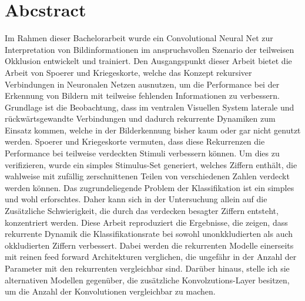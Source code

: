 \section*{Abcstract}
Im Rahmen dieser Bachelorarbeit wurde ein Convolutional Neural Net zur Interpretation von Bildinformationen im anspruchsvollen Szenario der teilweisen Okklusion entwickelt und trainiert. Den Ausgangspunkt dieser Arbeit bietet die Arbeit von Spoerer und Kriegeskorte, welche das Konzept rekursiver Verbindungen in Neuronalen Netzen ausnutzen, um die Performance bei der Erkennung von Bildern mit teilweise fehlenden Informationen zu verbessern. Grundlage ist die Beobachtung, dass im ventralen Visuellen System laterale und rückwärtsgewandte Verbindungen und dadurch rekurrente Dynamiken zum Einsatz kommen, welche in der Bilderkennung bisher kaum oder gar nicht genutzt werden. Spoerer und Kriegeskorte vermuten, dass diese Rekurrenzen die Performance bei teilweise verdeckten Stimuli verbessern können. Um dies zu verifizieren, wurde ein simples Stimulus-Set generiert, welches Ziffern enthält, die wahlweise mit zufällig zerschnittenen Teilen von verschiedenen Zahlen verdeckt werden können. Das zugrundeliegende Problem der Klassifikation ist ein simples und wohl erforschtes. Daher kann sich in der Untersuchung allein auf die Zusätzliche Schwierigkeit, die durch das verdecken besagter Ziffern entsteht, konzentriert werden. Diese Arbeit reproduziert die Ergebnisse, die zeigen, dass rekurrente Dynamik die Klassifikationsrate bei sowohl unonkkludierten als auch okkludierten Ziffern verbessert. Dabei werden die rekurrenten Modelle einerseits mit reinen feed forward Architekturen verglichen, die ungefähr in der Anzahl der Parameter mit den rekurrenten vergleichbar sind. Darüber hinaus, stelle ich sie alternativen Modellen gegenüber, die zusätzliche Konvolzutions-Layer besitzen, um die Anzahl der Konvolutionen vergleichbar zu machen.
